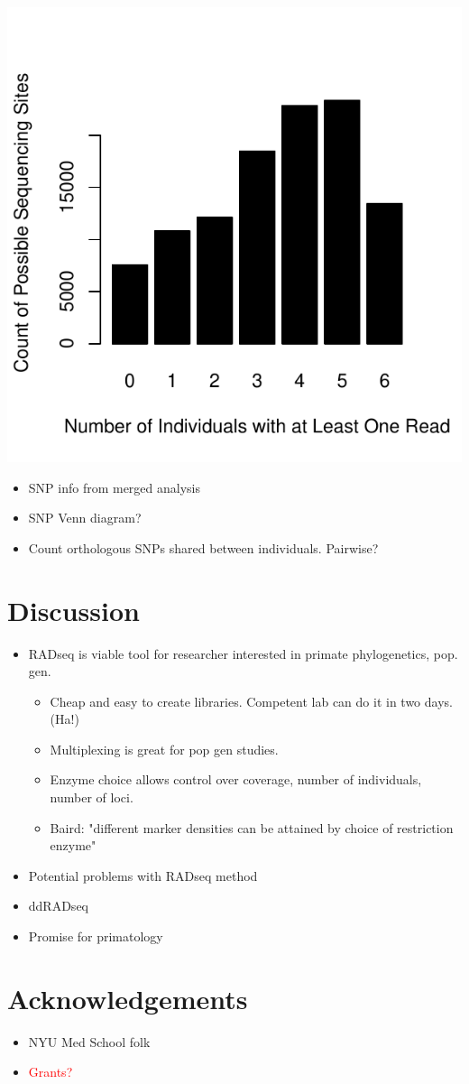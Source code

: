 \documentclass[12pt]{article}
\begin{document}
\includegraphics{figs/seq_site_coverage_by_ind}

\begin{itemize}
	\item SNP info from merged analysis
	\item SNP Venn diagram?
	\item Count orthologous SNPs shared between individuals. Pairwise?
\end{itemize}

\section{Discussion}
\begin{itemize}
	\item RADseq is viable tool for researcher interested in primate phylogenetics, pop. gen.
	\begin{itemize}
		\item Cheap and easy to create libraries. Competent lab can do it in two days. (Ha!)
		\item Multiplexing is great for pop gen studies.
		\item Enzyme choice allows control over coverage, number of individuals, number of loci.
		\item Baird: "different marker densities can be attained by choice of restriction enzyme"
	\end{itemize}
	\item Potential problems with RADseq method
	\item ddRADseq
	\item Promise for primatology
\end{itemize}

\section{Acknowledgements}
\begin{itemize}
	\item NYU Med School folk
	\item \textcolor{red}{Grants?}
\end{itemize}
\end{document}
